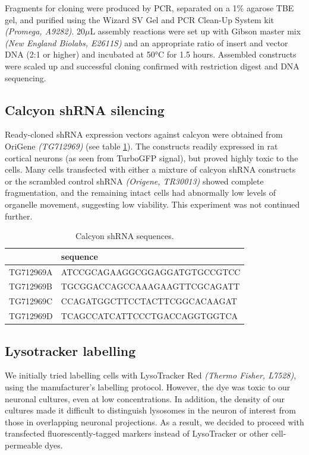 \documentclass[
  12pt,
  a4paper,
]{book}
\begin{document}
Fragments for cloning were produced by PCR, separated on a 1\% agarose TBE gel, and purified using the Wizard SV Gel and PCR Clean-Up System kit \emph{(Promega, A9282)}. 20\(\mu\)L assembly reactions were set up with Gibson master mix \emph{(New England Biolabs, E2611S)} and an appropriate ratio of insert and vector DNA (2:1 or higher) and incubated at 50°C for 1.5 hours. Assembled constructs were scaled up and successful cloning confirmed with restriction digest and DNA sequencing.

\hypertarget{calcyon-shrna-silencing}{%
\subsection{Calcyon shRNA silencing}\label{calcyon-shrna-silencing}}

Ready-cloned shRNA expression vectors against calcyon were obtained from OriGene \emph{(TG712969)} (see table \ref{tab:caly-tab}). The constructs readily expressed in rat cortical neurons (as seen from TurboGFP signal), but proved highly toxic to the cells. Many cells transfected with either a mixture of calcyon shRNA constructs or the scrambled control shRNA \emph{(Origene, TR30013)} showed complete fragmentation, and the remaining intact cells had abnormally low levels of organelle movement, suggesting low viability. This experiment was not continued further.

\begin{table}

\caption{\label{tab:caly-tab}Calcyon shRNA sequences.}
\centering
\begin{tabular}[t]{ll}
\toprule
  & sequence\\
\midrule
TG712969A & ATCCGCAGAAGGCGGAGGATGTGCCGTCC\\
TG712969B & TGCGGACCAGCCAAAGAAGTTCGCAGATT\\
TG712969C & CCAGATGGCTTCCTACTTCGGCACAAGAT\\
TG712969D & TCAGCCATCATTCCCTGACCAGGTGGTCA\\
\bottomrule
\end{tabular}
\end{table}

\hypertarget{lysotracker-labelling}{%
\subsection{Lysotracker labelling}\label{lysotracker-labelling}}

We initially tried labelling cells with LysoTracker Red \emph{(Thermo Fisher, L7528)}, using the manufacturer's labelling protocol. However, the dye was toxic to our neuronal cultures, even at low concentrations. In addition, the density of our cultures made it difficult to distinguish lysosomes in the neuron of interest from those in overlapping neuronal projections. As a result, we decided to proceed with transfected fluorescently-tagged markers instead of LysoTracker or other cell-permeable dyes.
\end{document}
